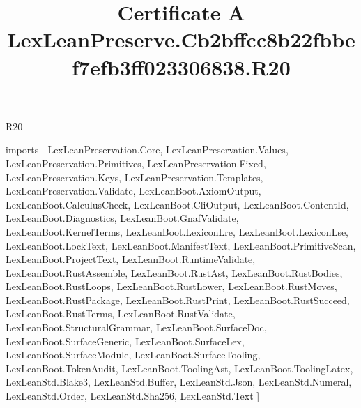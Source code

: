 \begin{lexlean}{R20}
\title{Certificate A LexLeanPreserve.Cb2bffcc8b22fbbef7efb3ff023306838.R20}
\begin{coremodule}
imports [
  LexLeanPreservation.Core,
  LexLeanPreservation.Values,
  LexLeanPreservation.Primitives,
  LexLeanPreservation.Fixed,
  LexLeanPreservation.Keys,
  LexLeanPreservation.Templates,
  LexLeanPreservation.Validate,
  LexLeanBoot.AxiomOutput,
  LexLeanBoot.CalculusCheck,
  LexLeanBoot.CliOutput,
  LexLeanBoot.ContentId,
  LexLeanBoot.Diagnostics,
  LexLeanBoot.GnafValidate,
  LexLeanBoot.KernelTerms,
  LexLeanBoot.LexiconLre,
  LexLeanBoot.LexiconLse,
  LexLeanBoot.LockText,
  LexLeanBoot.ManifestText,
  LexLeanBoot.PrimitiveScan,
  LexLeanBoot.ProjectText,
  LexLeanBoot.RuntimeValidate,
  LexLeanBoot.RustAssemble,
  LexLeanBoot.RustAst,
  LexLeanBoot.RustBodies,
  LexLeanBoot.RustLoops,
  LexLeanBoot.RustLower,
  LexLeanBoot.RustMoves,
  LexLeanBoot.RustPackage,
  LexLeanBoot.RustPrint,
  LexLeanBoot.RustSucceed,
  LexLeanBoot.RustTerms,
  LexLeanBoot.RustValidate,
  LexLeanBoot.StructuralGrammar,
  LexLeanBoot.SurfaceDoc,
  LexLeanBoot.SurfaceGeneric,
  LexLeanBoot.SurfaceLex,
  LexLeanBoot.SurfaceModule,
  LexLeanBoot.SurfaceTooling,
  LexLeanBoot.TokenAudit,
  LexLeanBoot.ToolingAst,
  LexLeanBoot.ToolingLatex,
  LexLeanStd.Blake3,
  LexLeanStd.Buffer,
  LexLeanStd.Json,
  LexLeanStd.Numeral,
  LexLeanStd.Order,
  LexLeanStd.Sha256,
  LexLeanStd.Text
]


\end{coremodule}
\end{lexlean}
